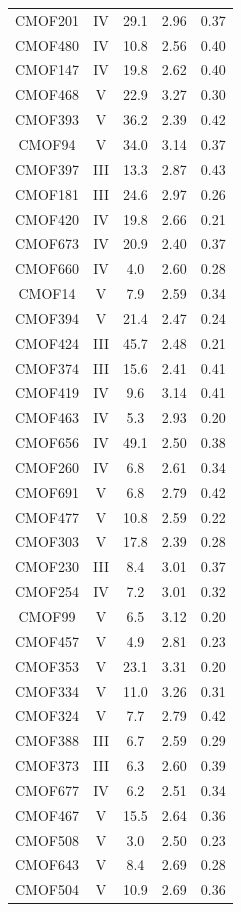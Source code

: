 \documentclass[review]{elsarticle} %
\begin{document}
\begin{longtable}[t]{ccccc}
CMOF201 & IV & 29.1 & 2.96 & 0.37\\
CMOF480 & IV & 10.8 & 2.56 & 0.40\\
CMOF147 & IV & 19.8 & 2.62 & 0.40\\
CMOF468 & V & 22.9 & 3.27 & 0.30\\
CMOF393 & V & 36.2 & 2.39 & 0.42\\
CMOF94 & V & 34.0 & 3.14 & 0.37\\
CMOF397 & III & 13.3 & 2.87 & 0.43\\
CMOF181 & III & 24.6 & 2.97 & 0.26\\
CMOF420 & IV & 19.8 & 2.66 & 0.21\\
CMOF673 & IV & 20.9 & 2.40 & 0.37\\
CMOF660 & IV & 4.0 & 2.60 & 0.28\\
CMOF14 & V & 7.9 & 2.59 & 0.34\\
CMOF394 & V & 21.4 & 2.47 & 0.24\\
CMOF424 & III & 45.7 & 2.48 & 0.21\\
CMOF374 & III & 15.6 & 2.41 & 0.41\\
CMOF419 & IV & 9.6 & 3.14 & 0.41\\
CMOF463 & IV & 5.3 & 2.93 & 0.20\\
CMOF656 & IV & 49.1 & 2.50 & 0.38\\
CMOF260 & IV & 6.8 & 2.61 & 0.34\\
CMOF691 & V & 6.8 & 2.79 & 0.42\\
CMOF477 & V & 10.8 & 2.59 & 0.22\\
CMOF303 & V & 17.8 & 2.39 & 0.28\\
CMOF230 & III & 8.4 & 3.01 & 0.37\\
CMOF254 & IV & 7.2 & 3.01 & 0.32\\
CMOF99 & V & 6.5 & 3.12 & 0.20\\
CMOF457 & V & 4.9 & 2.81 & 0.23\\
CMOF353 & V & 23.1 & 3.31 & 0.20\\
CMOF334 & V & 11.0 & 3.26 & 0.31\\
CMOF324 & V & 7.7 & 2.79 & 0.42\\
CMOF388 & III & 6.7 & 2.59 & 0.29\\
CMOF373 & III & 6.3 & 2.60 & 0.39\\
CMOF677 & IV & 6.2 & 2.51 & 0.34\\
CMOF467 & V & 15.5 & 2.64 & 0.36\\
CMOF508 & V & 3.0 & 2.50 & 0.23\\
CMOF643 & V & 8.4 & 2.69 & 0.28\\
CMOF504 & V & 10.9 & 2.69 & 0.36\\*
\end{longtable}
\endgroup{}
\end{document}

